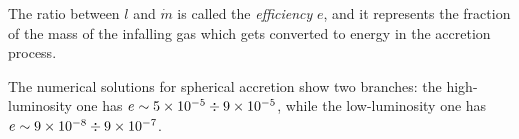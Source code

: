 \documentclass[main.tex]{subfiles}
\begin{document}
The ratio between \(l\) and \(\dot{m}\) is called the \emph{efficiency} \(e\), and it represents the fraction of the mass of the infalling gas which gets converted to energy in the accretion process.

The numerical solutions for spherical accretion show two branches: the high-luminosity one has \(e \sim \num{5e-5} \divisionsymbol \num{9e-5}\), while the low-luminosity one has \(e \sim \num{9e-8} \divisionsymbol \num{9e-7}\).
\end{document}

